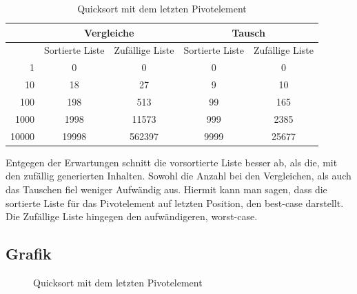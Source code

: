 \documentclass[12pt]{article}
\begin{document}
\begin{table}[ht]
\centering
\caption{Quicksort mit dem letzten Pivotelement}
\begin{tabular}{r|c|c|c|c}
\multicolumn{1}{l|}{} & \multicolumn{2}{c|}{\textbf{Vergleiche}} & \multicolumn{2}{c|}{\textbf{Tausch}} \\ \hline
\rowcolor[HTML]{EFEFEF} 
\multicolumn{1}{l|}{\cellcolor[HTML]{EFEFEF}Größe} & Sortierte Liste & Zufällige Liste & Sortierte Liste & Zufällige Liste \\ \hline
1 & 0 & 0 & 0 & 0 \\ \hline
10 & 18 & 27 & 9 & 10 \\ \hline
100 & 198 & 513 & 99 & 165 \\ \hline
1000 & 1998 & 11573 & 999 & 2385 \\ \hline
10000 & 19998 & 562397 & 9999 & 25677
\end{tabular}
\end{table}
Entgegen der Erwartungen schnitt die vorsortierte Liste besser ab, als die, mit den zufällig generierten Inhalten. Sowohl die Anzahl bei den Vergleichen, als auch das Tauschen fiel weniger Aufwändig aus. Hiermit kann man sagen, dass die sortierte Liste für das Pivotelement auf letzten Position, den best-case darstellt. Die Zufällige Liste hingegen den aufwändigeren, worst-case.

\subsection{Grafik}
\begin{figure}[h] 
\caption{Quicksort mit dem letzten Pivotelement} 
\end{figure} 
\end{document}
